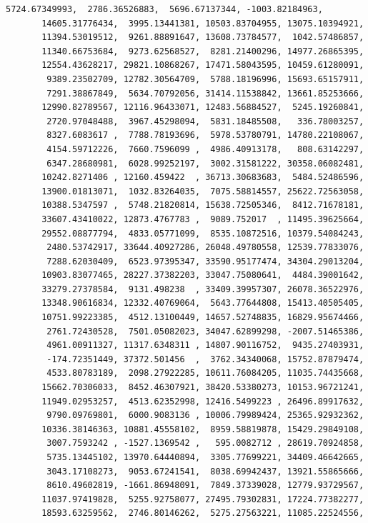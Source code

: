 \documentclass[11pt]{article}
\begin{document}
\begin{tcolorbox}[breakable, size=fbox, boxrule=.5pt, pad at break*=1mm, opacityfill=0]
\begin{Verbatim}[commandchars=\\\{\}]
        5724.67349993,  2786.36526883,  5696.67137344, -1003.82184963,
       14605.31776434,  3995.13441381, 10503.83704955, 13075.10394921,
       11394.53019512,  9261.88891647, 13608.73784577,  1042.57486857,
       11340.66753684,  9273.62568527,  8281.21400296, 14977.26865395,
       12554.43628217, 29821.10868267, 17471.58043595, 10459.61280091,
        9389.23502709, 12782.30564709,  5788.18196996, 15693.65157911,
        7291.38867849,  5634.70792056, 31414.11538842, 13661.85253666,
       12990.82789567, 12116.96433071, 12483.56884527,  5245.19260841,
        2720.97048488,  3967.45298094,  5831.18485508,   336.78003257,
        8327.6083617 ,  7788.78193696,  5978.53780791, 14780.22108067,
        4154.59712226,  7660.7596099 ,  4986.40913178,   808.63142297,
        6347.28680981,  6028.99252197,  3002.31581222, 30358.06082481,
       10242.8271406 , 12160.459422  , 36713.30683683,  5484.52486596,
       13900.01813071,  1032.83264035,  7075.58814557, 25622.72563058,
       10388.5347597 ,  5748.21820814, 15638.72505346,  8412.71678181,
       33607.43410022, 12873.4767783 ,  9089.752017  , 11495.39625664,
       29552.08877794,  4833.05771099,  8535.10872516, 10379.54084243,
        2480.53742917, 33644.40927286, 26048.49780558, 12539.77833076,
        7288.62030409,  6523.97395347, 33590.95177474, 34304.29013204,
       10903.83077465, 28227.37382203, 33047.75080641,  4484.39001642,
       33279.27378584,  9131.498238  , 33409.39957307, 26078.36522976,
       13348.90616834, 12332.40769064,  5643.77644808, 15413.40505405,
       10751.99223385,  4512.13100449, 14657.52748835, 16829.95674466,
        2761.72430528,  7501.05082023, 34047.62899298, -2007.51465386,
        4961.00911327, 11317.6348311 , 14807.90116752,  9435.27403931,
        -174.72351449, 37372.501456  ,  3762.34340068, 15752.87879474,
        4533.80783189,  2098.27922285, 10611.76084205, 11035.74435668,
       15662.70306033,  8452.46307921, 38420.53380273, 10153.96721241,
       11949.02953257,  4513.62352998, 12416.5499223 , 26496.89917632,
        9790.09769801,  6000.9083136 , 10006.79989424, 25365.92932362,
       10336.38146363, 10881.45558102,  8959.58819878, 15429.29849108,
        3007.7593242 , -1527.1369542 ,   595.0082712 , 28619.70924858,
        5735.13445102, 13970.64440894,  3305.77699221, 34409.46642665,
        3043.17108273,  9053.67241541,  8038.69942437, 13921.55865666,
        8610.49602819, -1661.86948091,  7849.37339028, 12779.93729567,
       11037.97419828,  5255.92758077, 27495.79302831, 17224.77382277,
       18593.63259562,  2746.80146262,  5275.27563221, 11085.22524556,

\end{Verbatim}
\end{tcolorbox}
\end{document}
